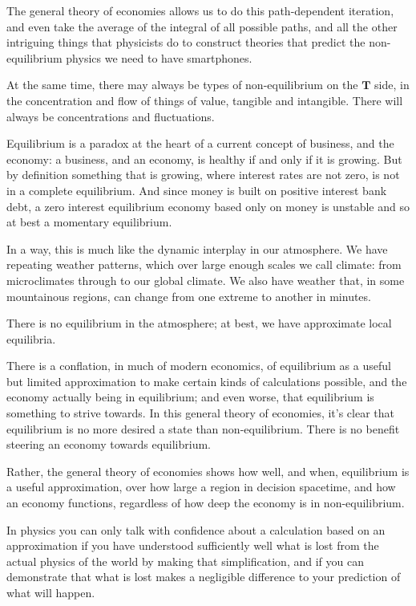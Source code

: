 The general theory of economies allows us to do this path\hyp{}dependent iteration, and even take the average of the integral of all possible paths, and all the other intriguing things that physicists do to construct theories that predict the non\hyp{}equilibrium physics we need to have smartphones.


At the same time, there may always be types of non\hyp{}equilibrium on the $\mathbf{T}$ side, in the concentration and flow of things of value, tangible and intangible. There will always be concentrations and fluctuations. 


Equilibrium is a paradox at the heart of a current concept of business, and the economy: a business, and an economy, is healthy if and only if it is growing. But by definition something that is growing, where interest rates are not zero, is not in a complete equilibrium. And since money is built on positive interest bank debt, a zero interest equilibrium economy based only on money is unstable\cite{graeber-debt} and so at best a momentary equilibrium.  


In a way, this is much like the dynamic interplay in our atmosphere. We have repeating weather patterns, which over large enough scales we call climate: from microclimates through to our global climate. We also have weather that, in some mountainous regions, can change from one extreme to another in minutes. 


There is no equilibrium in the atmosphere; at best, we have approximate local equilibria.


There is a conflation, in much of modern economics, of equilibrium as a useful but limited approximation to make certain kinds of calculations possible, and the economy actually being in equilibrium; and even worse, that equilibrium is something to strive towards. In this general theory of economies, it's clear that equilibrium is no more desired a state than non\hyp{}equilibrium.  There is no benefit steering an economy towards equilibrium.


Rather, the general theory of economies shows how well, and when, equilibrium is a useful approximation, over how large a region in decision spacetime, and how an economy functions, regardless of how deep the economy is in non\hyp{}equilibrium.


In physics  you can only talk with confidence about a calculation based on an approximation if you have understood sufficiently well what is lost from the actual physics of the world by making that simplification, and if you can demonstrate that what is lost makes a negligible difference to your prediction of what will happen. 


